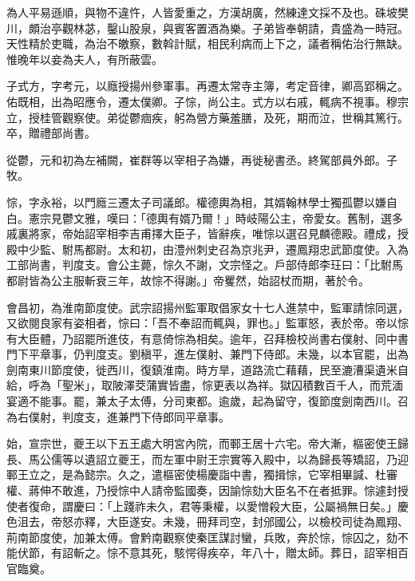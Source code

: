 \begin{pinyinscope}
 為人平易遜順，與物不違忤，人皆愛重之，方漢胡廣，然練達文採不及也。硃坡樊川，頗治亭觀林苾，鑿山股泉，與賓客置酒為樂。子弟皆奉朝請，貴盛為一時冠。天性精於吏職，為治不皦察，數斡計賦，相民利病而上下之，議者稱佑治行無缺。惟晚年以妾為夫人，有所蔽雲。



 子式方，字考元，以廕授揚州參軍事。再遷太常寺主簿，考定音律，卿高郢稱之。佑既相，出為昭應令，遷太僕卿。子悰，尚公主。式方以右戚，輒病不視事。穆宗立，授桂管觀察使。弟從鬱痼疾，躬為營方藥羞膳，及死，期而泣，世稱其篤行。卒，贈禮部尚書。



 從鬱，元和初為左補闕，崔群等以宰相子為嫌，再徙秘書丞。終駕部員外郎。子牧。



 悰，字永裕，以門廕三遷太子司議郎。權德輿為相，其婿翰林學士獨孤鬱以嫌自白。憲宗見鬱文雅，嘆曰：「德輿有婿乃爾！」時岐陽公主，帝愛女。舊制，選多戚裏將家，帝始詔宰相李吉甫擇大臣子，皆辭疾，唯悰以選召見麟德殿。禮成，授殿中少監、駙馬都尉。太和初，由澧州刺史召為京兆尹，遷鳳翔忠武節度使。入為工部尚書，判度支。會公主薨，悰久不謝，文宗怪之。戶部侍郎李玨曰：「比駙馬都尉皆為公主服斬衰三年，故悰不得謝。」帝矍然，始詔杖而期，著於令。



 會昌初，為淮南節度使。武宗詔揚州監軍取倡家女十七人進禁中，監軍請悰同選，又欲閱良家有姿相者，悰曰：「吾不奉詔而輒與，罪也。」監軍怒，表於帝。帝以悰有大臣體，乃詔罷所進伎，有意倚悰為相矣。逾年，召拜檢校尚書右僕射、同中書門下平章事，仍判度支。劉稹平，進左僕射、兼門下侍郎。未幾，以本官罷，出為劍南東川節度使，徙西川，復鎮淮南。時方旱，道路流亡藉藉，民至漉漕渠遺米自給，呼為「聖米」，取陂澤茭蒲實皆盡，悰更表以為祥。獄囚積數百千人，而荒湎宴適不能事。罷，兼太子太傅，分司東都。逾歲，起為留守，復節度劍南西川。召為右僕射，判度支，進兼門下侍郎同平章事。



 始，宣宗世，夔王以下五王處大明宮內院，而鄆王居十六宅。帝大漸，樞密使王歸長、馬公儒等以遺詔立夔王，而左軍中尉王宗實等入殿中，以為歸長等矯詔，乃迎鄆王立之，是為懿宗。久之，遣樞密使楊慶詣中書，獨揖悰，它宰相畢諴、杜審權、蔣伸不敢進，乃授悰中人請帝監國奏，因諭悰劾大臣名不在者抵罪。悰遽封授使者復命，謂慶曰：「上踐祚未久，君等秉權，以愛憎殺大臣，公屬禍無日矣。」慶色沮去，帝怒亦釋，大臣遂安。未幾，冊拜司空，封邠國公，以檢校司徒為鳳翔、荊南節度使，加兼太傅。會黔南觀察使秦匡謀討蠻，兵敗，奔於悰，悰囚之，劾不能伏節，有詔斬之。悰不意其死，駭愕得疾卒，年八十，贈太師。葬日，詔宰相百官臨奠。




\end{pinyinscope}

